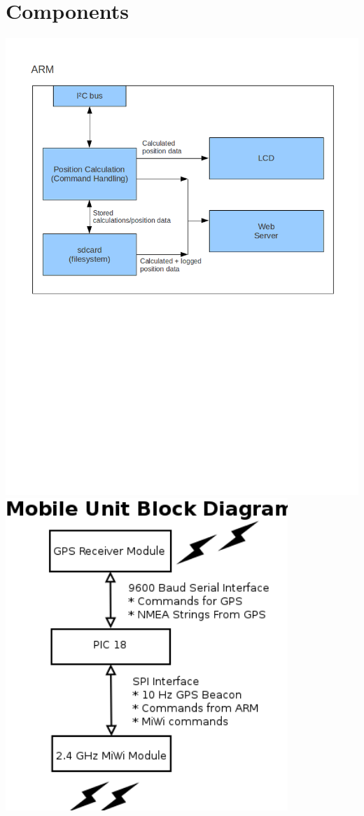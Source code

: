 \documentclass{article}
\begin{document}
\section*{Components}
\includegraphics[width=1.1\textwidth]{blockdiagram_arm}\newline
\includegraphics[width=0.8\textwidth]{mobileUnit} \newline
\end{document}
